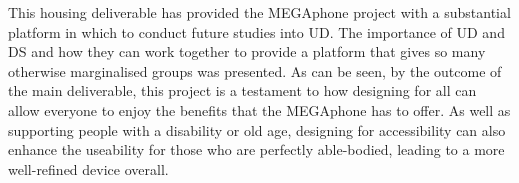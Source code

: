 This housing deliverable has provided the MEGAphone project with a substantial platform in which to conduct future studies into UD.
The importance of UD and DS and how they can work together to provide a platform that gives so many otherwise marginalised groups was presented.
As can be seen, by the outcome of the main deliverable, this project is a testament to how designing for all can allow everyone to enjoy the benefits that the MEGAphone has to offer.
As well as supporting people with a disability or old age, designing for accessibility can also enhance the useability for those who are perfectly able-bodied, leading to a more well-refined device overall.